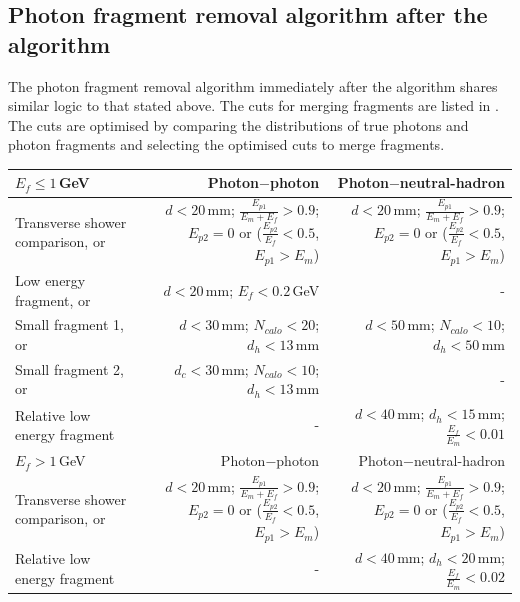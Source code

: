 \subsection{Photon fragment removal algorithm after the \PhotonReconstruction algorithm}

The photon fragment removal algorithm immediately after the \PhotonReconstruction algorithm shares similar logic to that  stated above. The cuts for merging fragments are listed in . The cuts are optimised by comparing the distributions of true photons and photon fragments and selecting the optimised cuts to merge fragments.



\begin{table}[htbp]
\centering

\smallskip

\begin{tabular}{l  r  r }
\hline
\hline
$E_f\leqslant1$\,GeV &  Photon$-$photon & Photon$-$neutral-hadron \\
\hline
\multicolumn{1}{L{0.3\textwidth}}{Transverse shower comparison, or} & \multicolumn{1}{R{0.3\textwidth}}{$d < 20 $\,mm; $\frac{E_{p1}}{E_m + E_f} > 0.9 $; $E_{p2} = 0$ or ($\frac{E_{p2}}{E_f} < 0.5 $, $E_{p1} > E_m$)}  & \multicolumn{1}{R{0.3\textwidth}}{$d < 20 $\,mm; $\frac{E_{p1}}{E_m + E_f} > 0.9 $; $E_{p2} = 0$ or ($\frac{E_{p2}}{E_f} < 0.5 $, $E_{p1} > E_m$)} \\
\multicolumn{1}{L{0.3\textwidth}}{Low energy fragment, or} & \multicolumn{1}{R{0.3\textwidth}}{$d < 20 $\,mm; $E_f < 0.2 $\,GeV}  & \multicolumn{1}{R{0.3\textwidth}}{-} \\
\multicolumn{1}{L{0.3\textwidth}}{Small fragment 1, or} & \multicolumn{1}{R{0.3\textwidth}}{$d < 30 $\,mm; $N_{calo} < 20 $; $d_h < 13 $\,mm}  & \multicolumn{1}{R{0.3\textwidth}}{$d < 50 $\,mm; $N_{calo} < 10 $; $d_h < 50$\,mm} \\
\multicolumn{1}{L{0.3\textwidth}}{Small fragment 2, or} & \multicolumn{1}{R{0.3\textwidth}}{$d_c < 30 $\,mm; $N_{calo} < 10 $; $d_h < 13 $\,mm}  & \multicolumn{1}{R{0.3\textwidth}}{-} \\

\multicolumn{1}{L{0.3\textwidth}}{Relative low energy fragment} & \multicolumn{1}{R{0.3\textwidth}}{-}  & \multicolumn{1}{R{0.3\textwidth}}{$d < 40$\,mm; $d_h < 15$\,mm; $\frac{E_{f}}{E_m} < 0.01$} \\
\hline
$E_f>1$\,GeV &  Photon$-$photon & Photon$-$neutral-hadron \\
\hline
\multicolumn{1}{L{0.3\textwidth}}{Transverse shower comparison, or} & \multicolumn{1}{R{0.3\textwidth}}{$d< 20$\,mm; $\frac{E_{p1}}{E_m + E_f} > 0.9 $; $E_{p2} = 0$ or ($\frac{E_{p2}}{E_f} < 0.5 $, $E_{p1} > E_m$)}  & \multicolumn{1}{R{0.3\textwidth}}{$d< 20$\,mm; $\frac{E_{p1}}{E_m + E_f} > 0.9 $; $E_{p2} = 0$ or ($\frac{E_{p2}}{E_f} < 0.5 $, $E_{p1} > E_m$)} \\
\multicolumn{1}{L{0.3\textwidth}}{Relative low energy fragment } & \multicolumn{1}{R{0.3\textwidth}}{-} & \multicolumn{1}{R{0.3\textwidth}}{$d < 40$\,mm; $d_h < 20$\,mm; $\frac{E_f}{E_m} < 0.02$} \\
\hline
\hline
\end{tabular}


\end{table}
